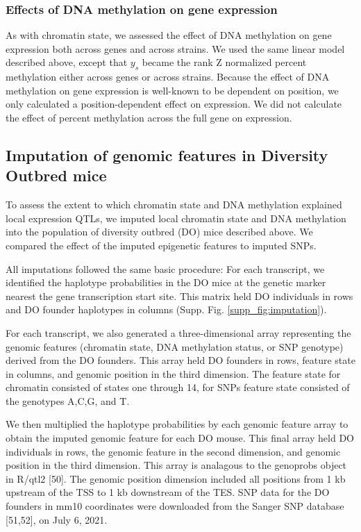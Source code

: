 \documentclass[10pt,letterpaper]{article}
\begin{document}
\hypertarget{effects-of-dna-methylation-on-gene-expression}{%
\subsubsection{Effects of DNA methylation on gene
expression}\label{effects-of-dna-methylation-on-gene-expression}}

As with chromatin state, we assessed the effect of DNA methylation on
gene expression both across genes and across strains. We used the same
linear model described above, except that \(y_{s}\) became the rank Z
normalized percent methylation either across genes or across strains.
Because the effect of DNA methylation on gene expression is well-known
to be dependent on position, we only calculated a position-dependent
effect on expression. We did not calculate the effect of percent
methylation across the full gene on expression.

\hypertarget{imputation-of-genomic-features-in-diversity-outbred-mice}{%
\subsection{Imputation of genomic features in Diversity Outbred
mice}\label{imputation-of-genomic-features-in-diversity-outbred-mice}}

To assess the extent to which chromatin state and DNA methylation
explained local expression QTLs, we imputed local chromatin state and
DNA methylation into the population of diversity outbred (DO) mice
described above. We compared the effect of the imputed epigenetic
features to imputed SNPs.

All imputations followed the same basic procedure: For each transcript,
we identified the haplotype probabilities in the DO mice at the genetic
marker nearest the gene transcription start site. This matrix held DO
individuals in rows and DO founder haplotypes in columns (Supp. Fig.
\ref{supp_fig:imputation}).

For each transcript, we also generated a three-dimensional array
representing the genomic features (chromatin state, DNA methylation
status, or SNP genotype) derived from the DO founders. This array held
DO founders in rows, feature state in columns, and genomic position in
the third dimension. The feature state for chromatin consisted of states
one through 14, for SNPs feature state consisted of the genotypes A,C,G,
and T.

We then multiplied the haplotype probabilities by each genomic feature
array to obtain the imputed genomic feature for each DO mouse. This
final array held DO individuals in rows, the genomic feature in the
second dimension, and genomic position in the third dimension. This
array is analagous to the genoprobs object in R/qtl2 {[}50{]}. The
genomic position dimension included all positions from 1 kb upstream of
the TSS to 1 kb downstream of the TES. SNP data for the DO founders in
mm10 coordinates were downloaded from the Sanger SNP database
{[}51,52{]}, on July 6, 2021.
\end{document}
